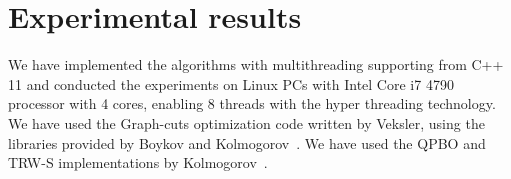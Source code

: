 \section{Experimental results}
\label{section:results}
We have implemented the algorithms with multithreading supporting from
C++ 11 and conducted the experiments on Linux PCs with Intel Core i7
4790 processor with 4 cores, enabling 8 threads with the hyper
threading technology. We have used the Graph-cuts optimization code
written by Veksler, using the libraries provided by Boykov and
Kolmogorov~\cite{middlebury_mrf,alpha_expansion,what_energy_can_be_min_by_gc, mrf_experimental}.
%
%
We have used the QPBO and TRW-S implementations by
Kolmogorov~\cite{QPBO, TRW-S_implementation}.



